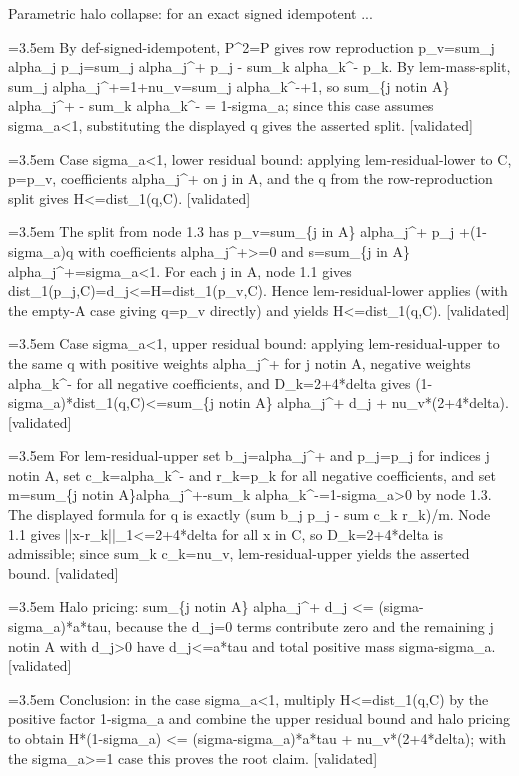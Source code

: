 \documentclass{article}
\newcommand{\step}[1]{\par\noindent\hangindent=3.5em\hangafter=1%
  \makebox[3.5em][l]{\textbf{#1.}}}
\newcommand{\steptag}[1]{\hfill{\small\textsf{[#1]}}}
\begin{document}
\begin{proofbox}{Parametric halo collapse: for an exact signed idempotent ...}
\step{1.3.1} By def-signed-idempotent, P\textasciicircum{}2=P gives row reproduction p\_v=sum\_j alpha\_j p\_j=sum\_j alpha\_j\textasciicircum{}+ p\_j - sum\_k alpha\_k\textasciicircum{}- p\_k. By lem-mass-split, sum\_j alpha\_j\textasciicircum{}+=1+nu\_v=sum\_j alpha\_k\textasciicircum{}-+1, so sum\_\{j notin A\} alpha\_j\textasciicircum{}+ - sum\_k alpha\_k\textasciicircum{}- = 1-sigma\_a; since this case assumes sigma\_a<1, substituting the displayed q gives the asserted split. \steptag{validated} \\[4pt]
\step{1.4} Case sigma\_a<1, lower residual bound: applying lem-residual-lower to C, p=p\_v, coefficients alpha\_j\textasciicircum{}+ on j in A, and the q from the row-reproduction split gives H<=dist\_1(q,C). \steptag{validated} \\[6pt]
\step{1.4.1} The split from node 1.3 has p\_v=sum\_\{j in A\} alpha\_j\textasciicircum{}+ p\_j +(1-sigma\_a)q with coefficients alpha\_j\textasciicircum{}+>=0 and s=sum\_\{j in A\} alpha\_j\textasciicircum{}+=sigma\_a<1. For each j in A, node 1.1 gives dist\_1(p\_j,C)=d\_j<=H=dist\_1(p\_v,C). Hence lem-residual-lower applies (with the empty-A case giving q=p\_v directly) and yields H<=dist\_1(q,C). \steptag{validated} \\[4pt]
\step{1.5} Case sigma\_a<1, upper residual bound: applying lem-residual-upper to the same q with positive weights alpha\_j\textasciicircum{}+ for j notin A, negative weights alpha\_k\textasciicircum{}- for all negative coefficients, and D\_k=2+4*delta gives (1-sigma\_a)*dist\_1(q,C)<=sum\_\{j notin A\} alpha\_j\textasciicircum{}+ d\_j + nu\_v*(2+4*delta). \steptag{validated} \\[6pt]
\step{1.5.1} For lem-residual-upper set b\_j=alpha\_j\textasciicircum{}+ and p\_j=p\_j for indices j notin A, set c\_k=alpha\_k\textasciicircum{}- and r\_k=p\_k for all negative coefficients, and set m=sum\_\{j notin A\}alpha\_j\textasciicircum{}+-sum\_k alpha\_k\textasciicircum{}-=1-sigma\_a>0 by node 1.3. The displayed formula for q is exactly (sum b\_j p\_j - sum c\_k r\_k)/m. Node 1.1 gives ||x-r\_k||\_1<=2+4*delta for all x in C, so D\_k=2+4*delta is admissible; since sum\_k c\_k=nu\_v, lem-residual-upper yields the asserted bound. \steptag{validated} \\[4pt]
\step{1.6} Halo pricing: sum\_\{j notin A\} alpha\_j\textasciicircum{}+ d\_j <= (sigma-sigma\_a)*a*tau, because the d\_j=0 terms contribute zero and the remaining j notin A with d\_j>0 have d\_j<=a*tau and total positive mass sigma-sigma\_a. \steptag{validated} \\[4pt]
\step{1.7} Conclusion: in the case sigma\_a<1, multiply H<=dist\_1(q,C) by the positive factor 1-sigma\_a and combine the upper residual bound and halo pricing to obtain H*(1-sigma\_a) <= (sigma-sigma\_a)*a*tau + nu\_v*(2+4*delta); with the sigma\_a>=1 case this proves the root claim. \steptag{validated} \\[4pt]
\end{proofbox}
\end{document}
